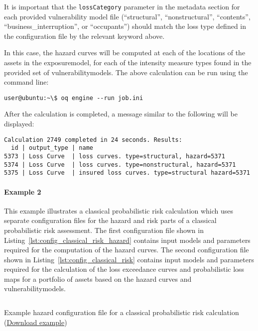 It is important that the
\Verb+lossCategory+ parameter in the metadata section for each provided
vulnerability model file (``structural'', ``nonstructural'', ``contents'',
``business\_interruption'', or ``occupants'') should match the loss type
defined in the configuration file by the relevant keyword above.

In this case, the hazard curves will be computed at each of the locations of
the \glspl{asset} in the \gls{exposuremodel}, for each of the intensity
measure types found in the provided set of \glspl{vulnerabilitymodel}. The
above calculation can be run using the command line:

\begin{verbatim}
user@ubuntu:~\$ oq engine --run job.ini
\end{verbatim}

After the calculation is completed, a message similar to the following will be
displayed:

\begin{verbatim}
Calculation 2749 completed in 24 seconds. Results:
  id | output_type | name
5373 | Loss Curve  | loss curves. type=structural, hazard=5371
5374 | Loss Curve  | loss curves. type=nonstructural, hazard=5371
5375 | Loss Curve  | insured loss curves. type=structural hazard=5371
\end{verbatim}


\paragraph{Example 2}

This example illustrates a classical probabilistic risk calculation which uses
separate configuration files for the hazard and risk parts of a classical
probabilistic risk assessment. The first configuration file shown in
Listing~\ref{lst:config_classical_risk_hazard} contains input models and
parameters required for the computation of the hazard curves. The second
configuration file shown in Listing~\ref{lst:config_classical_risk} contains
input models and parameters required for the calculation of the loss
exceedance curves and probabilistic loss maps for a portfolio of \glspl{asset}
based on the hazard curves and \glspl{vulnerabilitymodel}.

\begin{listing}[htbp]
  \inputminted[firstline=1,firstnumber=1,fontsize=\footnotesize,frame=single,linenos,bgcolor=lightgray,label=job\_hazard.ini]{ini}{oqum/risk/verbatim/config_classical_hazard.ini}
  \caption{Example hazard configuration file for a classical probabilistic risk calculation (\href{https://raw.githubusercontent.com/GEMScienceTools/oq-engine-docs/master/oqum/risk/verbatim/config_classical_hazard.xml}{Download example})}
  \label{lst:config_classical_risk_hazard}
\end{listing}

